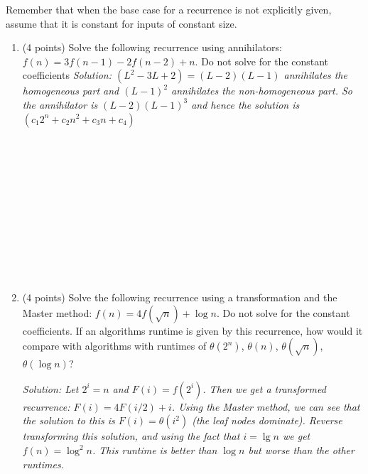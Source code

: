 \documentclass[11pt]{article}
\newcommand{\ans}[1]{\emph{Solution: #1}}
\begin{document}
\begin{enumerate}
 
 
 
 Remember that when the base case for a recurrence is not explicitly given, assume that it is constant for inputs of constant size.
 
 \begin{enumerate}
 
 \item (4 points) Solve the following recurrence using annihilators: $f(n) = 3f(n-1) - 2f(n-2) + n$.  Do not solve for the constant coefficients
\ans{$(L^{2}-3L+2) = (L-2)(L-1)$ annihilates the homogeneous part and $(L-1)^{2}$ annihilates the non-homogeneous part.  So the annihilator is $(L-2)(L-1)^{3}$ and hence the solution is $(c_{1}2^{n} + c_{2} n^{2} + c_{3}n + c_{4})$}
 \ \\ \ \\  \ \\ \ \\ \ \\  \ \\ \ \\ \ \\  \ \\ \ \\ \ \\  \ \\

\item (4 points) Solve the following recurrence using a transformation and the Master method: $f(n) = 4f(\sqrt{n}) + \log n$.  Do not solve for the constant coefficients.  If an algorithms runtime is given by this recurrence, how would it compare with algorithms with runtimes of $\theta(2^{n})$, $\theta(n)$, $\theta(\sqrt{n})$, $\theta(\log n)$?

 \ans{Let $2^{i}=n$ and $F(i) = f(2^{i})$.  Then we get a transformed recurrence: $F(i) = 4F(i/2) + i$.  Using the Master method, we can see that the solution to this is $F(i) = \theta(i^{2})$ (the leaf nodes dominate).   
  Reverse transforming this solution, and using the fact that $i = \lg n$ we get  
 $f(n) = \log^{2} n $.  This runtime is better than $\log n$ but worse than the other runtimes.}
 \ \\ \ \\  \ \\ \ \\ \ \\  \ \\ \ \\ \ \\  \ \\ \ \\ \ \\  \ \\


\end{enumerate}
\end{enumerate}
\end{document}
